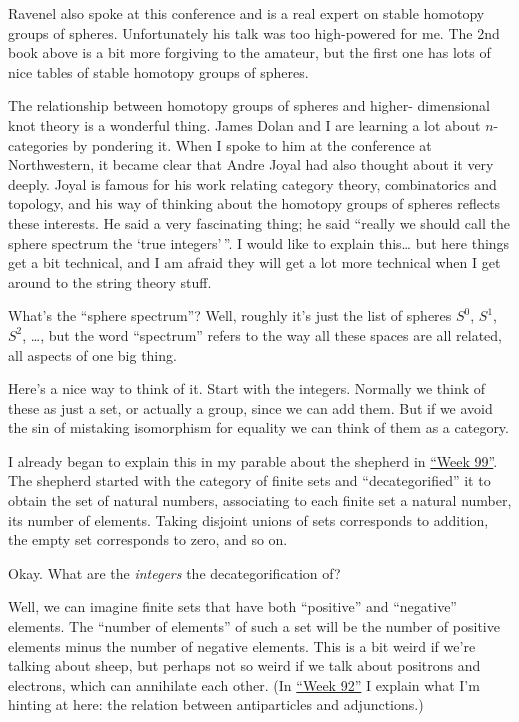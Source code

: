 \documentclass{article}
\begin{document}
Ravenel also spoke at this conference and is a real expert on stable
homotopy groups of spheres. Unfortunately his talk was too high-powered
for me. The 2nd book above is a bit more forgiving to the amateur, but
the first one has lots of nice tables of stable homotopy groups of
spheres.

The relationship between homotopy groups of spheres and higher-
dimensional knot theory is a wonderful thing. James Dolan and I are
learning a lot about \(n\)-categories by pondering it. When I spoke to
him at the conference at Northwestern, it became clear that Andre Joyal
had also thought about it very deeply. Joyal is famous for his work
relating category theory, combinatorics and topology, and his way of
thinking about the homotopy groups of spheres reflects these interests.
He said a very fascinating thing; he said ``really we should call the
sphere spectrum the `true integers'\,''. I would like to explain
this\ldots{} but here things get a bit technical, and I am afraid they
will get a lot more technical when I get around to the string theory
stuff.

What's the ``sphere spectrum''? Well, roughly it's just the list of
spheres \(S^0\), \(S^1\), \(S^2\), \ldots, but the word ``spectrum''
refers to the way all these spaces are all related, all aspects of one
big thing.

Here's a nice way to think of it. Start with the integers. Normally we
think of these as just a set, or actually a group, since we can add
them. But if we avoid the sin of mistaking isomorphism for equality we
can think of them as a category.

I already began to explain this in my parable about the shepherd in
\protect\hyperlink{week99}{``Week 99''}. The shepherd started with the
category of finite sets and ``decategorified'' it to obtain the set of
natural numbers, associating to each finite set a natural number, its
number of elements. Taking disjoint unions of sets corresponds to
addition, the empty set corresponds to zero, and so on.

Okay. What are the \emph{integers} the decategorification of?

Well, we can imagine finite sets that have both ``positive'' and
``negative'' elements. The ``number of elements'' of such a set will be
the number of positive elements minus the number of negative elements.
This is a bit weird if we're talking about sheep, but perhaps not so
weird if we talk about positrons and electrons, which can annihilate
each other. (In \protect\hyperlink{week92}{``Week 92''} I explain what
I'm hinting at here: the relation between antiparticles and
adjunctions.)
\end{document}
